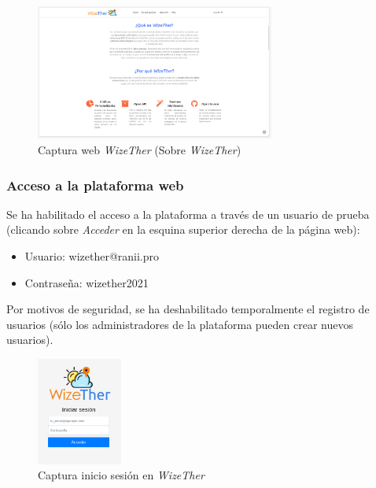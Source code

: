 \documentclass[12pt]{article}
\begin{document}
\begin{figure}[h]
	\begin{center}
		\includegraphics[width=0.7\textwidth]{img_rani/web_wizether.png}
		\caption{Captura web \textit{WizeTher} (Sobre \textit{WizeTher})}
	\end{center}
\end{figure}

\pagebreak

\subsubsection{Acceso a la plataforma web}

\noindent Se ha habilitado el acceso a la plataforma a través de un usuario de prueba (clicando sobre \textit{Acceder} en la esquina superior derecha de la página web):

\begin{itemize}
	\item Usuario: wizether@ranii.pro 
	\item Contraseña: wizether2021
\end{itemize}

\noindent Por motivos de seguridad, se ha deshabilitado temporalmente el registro de usuarios (sólo los administradores de la plataforma pueden crear nuevos usuarios).

\begin{figure}[h]
	\begin{center}
		\includegraphics[width=0.25\textwidth]{img_rani/inicar_sesion.png}
		\caption{Captura inicio sesión en \textit{WizeTher}}
	\end{center}
\end{figure}
\end{document}
